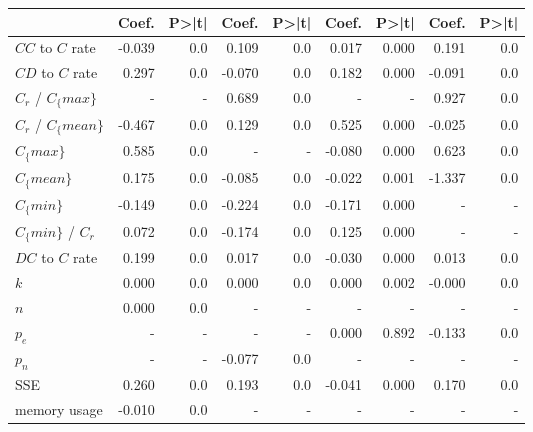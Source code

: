 \begin{tabular}{lrrrrrrrr}
\toprule
{} &  Coef. &  P>|t| &  Coef. &  P>|t| &  Coef. &  P>|t| &  Coef. &  P>|t| \\
\midrule
$CC$ to $C$ rate   & -0.039 &    0.0 &  0.109 &    0.0 &  0.017 &  0.000 &  0.191 &    0.0 \\
$CD$ to $C$ rate   &  0.297 &    0.0 & -0.070 &    0.0 &  0.182 &  0.000 & -0.091 &    0.0 \\
$C_r$ / $C_\{max\}$  &    - &    - &  0.689 &    0.0 &    - &    - &  0.927 &    0.0 \\
$C_r$ / $C_\{mean\}$ & -0.467 &    0.0 &  0.129 &    0.0 &  0.525 &  0.000 & -0.025 &    0.0 \\
$C_\{max\}$          &  0.585 &    0.0 &    - &    - & -0.080 &  0.000 &  0.623 &    0.0 \\
$C_\{mean\}$         &  0.175 &    0.0 & -0.085 &    0.0 & -0.022 &  0.001 & -1.337 &    0.0 \\
$C_\{min\}$          & -0.149 &    0.0 & -0.224 &    0.0 & -0.171 &  0.000 &    - &    - \\
$C_\{min\}$ / $C_r$  &  0.072 &    0.0 & -0.174 &    0.0 &  0.125 &  0.000 &    - &    - \\
$DC$ to $C$ rate   &  0.199 &    0.0 &  0.017 &    0.0 & -0.030 &  0.000 &  0.013 &    0.0 \\
$k$                &  0.000 &    0.0 &  0.000 &    0.0 &  0.000 &  0.002 & -0.000 &    0.0 \\
$n$                &  0.000 &    0.0 &    - &    - &    - &    - &    - &    - \\
$p_e$              &    - &    - &    - &    - &  0.000 &  0.892 & -0.133 &    0.0 \\
$p_n$              &    - &    - & -0.077 &    0.0 &    - &    - &    - &    - \\
SSE                &  0.260 &    0.0 &  0.193 &    0.0 & -0.041 &  0.000 &  0.170 &    0.0 \\
memory usage       & -0.010 &    0.0 &    - &    - &    - &    - &    - &    - \\
\bottomrule
\end{tabular}
